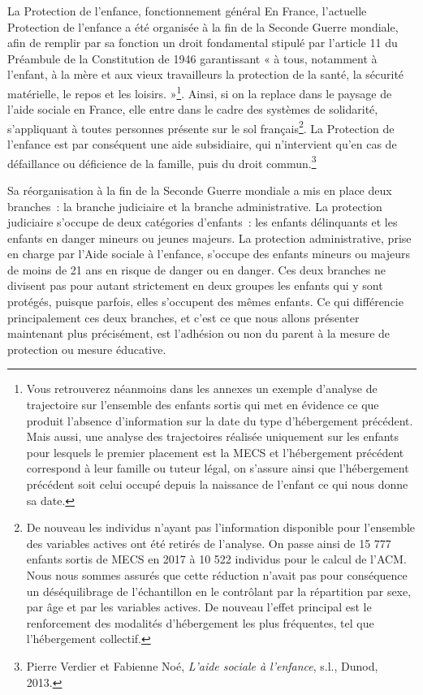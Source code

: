\documentclass[
  12,
  a4paper,
]{report}
\begin{document}
La Protection de l'enfance, fonctionnement général En France, l'actuelle
Protection de l'enfance a été organisée à la fin de la Seconde Guerre
mondiale, afin de remplir par sa fonction un droit fondamental stipulé
par l'article 11 du Préambule de la Constitution de 1946 garantissant «
à tous, notamment à l'enfant, à la mère et aux vieux travailleurs la
protection de la santé, la sécurité matérielle, le repos et les loisirs.
»\footnote{Vous retrouverez néanmoins dans les annexes un exemple
  d'analyse de trajectoire sur l'ensemble des enfants sortis qui met en
  évidence ce que produit l'absence d'information sur la date du type
  d'hébergement précédent. Mais aussi, une analyse des trajectoires
  réalisée uniquement sur les enfants pour lesquels le premier placement
  est la MECS et l'hébergement précédent correspond à leur famille ou
  tuteur légal, on s'assure ainsi que l'hébergement précédent soit celui
  occupé depuis la naissance de l'enfant ce qui nous donne sa date.}.
Ainsi, si on la replace dans le paysage de l'aide sociale en France,
elle entre dans le cadre des systèmes de solidarité, s'appliquant à
toutes personnes présente sur le sol français\footnote{De nouveau les
  individus n'ayant pas l'information disponible pour l'ensemble des
  variables actives ont été retirés de l'analyse. On passe ainsi de 15
  777 enfants sortis de MECS en 2017 à 10 522 individus pour le calcul
  de l'ACM. Nous nous sommes assurés que cette réduction n'avait pas
  pour conséquence un déséquilibrage de l'échantillon en le contrôlant
  par la répartition par sexe, par âge et par les variables actives. De
  nouveau l'effet principal est le renforcement des modalités
  d'hébergement les plus fréquentes, tel que l'hébergement collectif.}.
La Protection de l'enfance est par conséquent une aide subsidiaire, qui
n'intervient qu'en cas de défaillance ou déficience de la famille, puis
du droit commun.\footnote{Pierre Verdier et Fabienne Noé, \emph{L'aide
  sociale à l'enfance}, s.l., {Dunod}, 2013.}

Sa réorganisation à la fin de la Seconde Guerre mondiale a mis en place
deux branches~: la branche judiciaire et la branche administrative. La
protection judiciaire s'occupe de deux catégories d'enfants~: les
enfants délinquants et les enfants en danger mineurs ou jeunes majeurs.
La protection administrative, prise en charge par l'Aide sociale à
l'enfance, s'occupe des enfants mineurs ou majeurs de moins de 21 ans en
risque de danger ou en danger. Ces deux branches ne divisent pas pour
autant strictement en deux groupes les enfants qui y sont protégés,
puisque parfois, elles s'occupent des mêmes enfants. Ce qui différencie
principalement ces deux branches, et c'est ce que nous allons présenter
maintenant plus précisément, est l'adhésion ou non du parent à la mesure
de protection ou mesure éducative.
\end{document}
